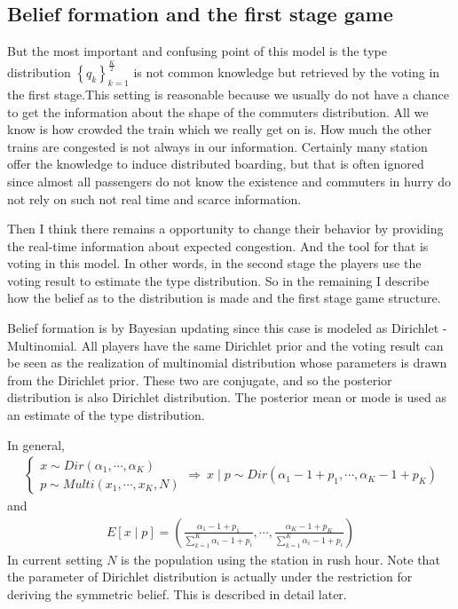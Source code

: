 \documentclass{article}
\begin{document}
\subsection{Belief formation and the first stage game}
But the most important and confusing point of this model is the type distribution $\left\{ q_k \right\}_{k = 1}^{\frac{K}{2}}$ is not common knowledge but retrieved by the voting in the first stage.This setting is reasonable because we usually do not have a chance to get the information about the shape of the commuters distribution. All we know is how crowded the train which we really get on is. How much the other trains are congested is not always in our information. Certainly many station offer the knowledge to induce distributed boarding, but that is often ignored  since almost all passengers do not  know the existence and commuters in hurry do not rely on such not real time and scarce information.

Then I think there remains a opportunity to change their behavior by providing the real-time information about expected congestion. And the tool for that is voting in this model. In other words, in the second stage the players use the voting result to estimate the type distribution. So in the remaining I describe how the belief as to the distribution is made and the first stage game structure.

Belief formation is by Bayesian updating since  this case is modeled as Dirichlet - Multinomial. All players have the same Dirichlet prior and the voting result can be seen as the realization of multinomial distribution whose parameters is drawn from the Dirichlet prior. These two are conjugate, and so the posterior distribution is also Dirichlet distribution. The posterior mean or mode is used as an estimate of the type distribution.

In general,
\begin{align*}
	\begin{cases}
	x \sim Dir(\alpha_1, \cdots, \alpha_K)\\
	p \sim Multi(x_1,\cdots,x_K, N)
	\end{cases}
	\Rightarrow\ 
	x\mid p \sim Dir(\alpha_1 -1 + p_1, \cdots, \alpha_K -1 + p_K)
\end{align*}
and
\begin{align*}
	E[x \mid p] = \left( \frac{\alpha_1 - 1 + p_1}{\sum_{k = 1}^K \alpha_i -1 + p_i} , \cdots, \frac{\alpha_K - 1 + p_K}{\sum_{k = 1}^K \alpha_i -1 + p_i}\right)
\end{align*}
In current setting $N$ is the population using the station in rush hour. Note that the parameter of Dirichlet distribution is actually under the restriction for deriving the symmetric belief. This is described in detail later.
\end{document}
